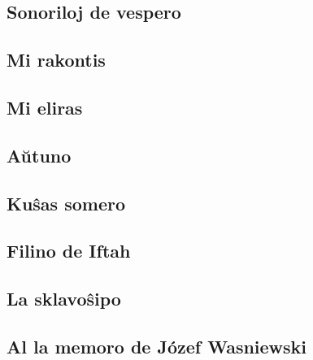 \documentclass[a5paper,11pt,openany,twoside,leqno]{book}
\begin{document}
\subsection{Sonoriloj de vespero}
\label{sonoriloj}


\subsection{Mi rakontis}
\label{rakontis}
 

\vspace*{-5ex} %

\subsection{Mi eliras}
\label{eliras}


\subsection{A\u utuno} %
\label{auxtuno}


\subsection{Ku\^sas somero}
\label{somero}


\subsection{Filino de Iftah}
\label{filino}

\subsection{La sklavo\^sipo}
\label{sklavo}


\subsection{Al la memoro de J\'ozef Wasniewski}
\label{memoro}


\end{document}
